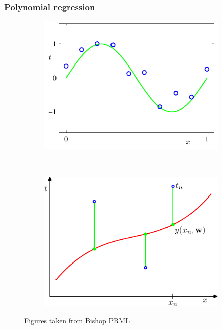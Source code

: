 \subsubsection{Polynomial regression}
\begin{figure}
	\centering
	\begin{subfigure}[b]{0.45\textwidth}
                \centering
                \includegraphics[width=\textwidth]{./lecture1/Figure1_2}
    \end{subfigure}%
	~
	\begin{subfigure}[b]{0.45\textwidth}
                \centering
                \includegraphics[width=\textwidth]{./lecture1/Figure1_3}
    \end{subfigure}%
	\caption{Figures taken from Bishop PRML}
\end{figure}

